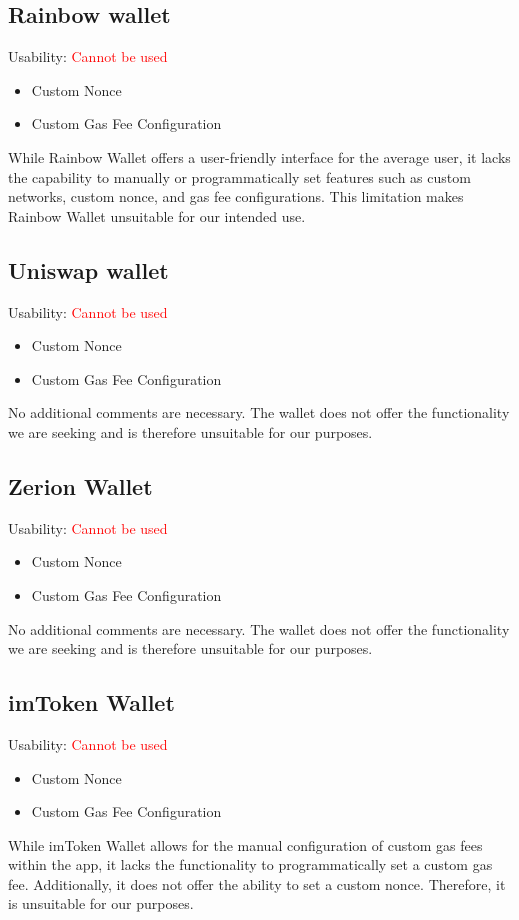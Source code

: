 \documentclass[fleqn,10pt]{olplainarticle}
\newcommand{\xmark}{\ding{55}}%
\begin{document}
\subsection{Rainbow wallet}
Usability: \textcolor{red}{Cannot be used}
\begin{itemize}[noitemsep, nolistsep]
	\item [\textcolor{red}{\xmark}] Custom Nonce
	\item [\textcolor{red}{\xmark}] Custom Gas Fee Configuration
\end{itemize}
While Rainbow Wallet offers a user-friendly interface for the average user, it lacks the capability to manually or programmatically set features such as custom networks, custom nonce, and gas fee configurations. This limitation makes Rainbow Wallet unsuitable for our intended use.

\subsection{Uniswap wallet}
Usability: \textcolor{red}{Cannot be used}
\begin{itemize}[noitemsep, nolistsep]
	\item [\textcolor{red}{\xmark}] Custom Nonce
	\item [\textcolor{red}{\xmark}] Custom Gas Fee Configuration
\end{itemize}
No additional comments are necessary. The wallet does not offer the functionality we are seeking and is therefore unsuitable for our purposes.

\subsection{Zerion Wallet}
Usability: \textcolor{red}{Cannot be used}
\begin{itemize}[noitemsep, nolistsep]
	\item [\textcolor{red}{\xmark}] Custom Nonce
	\item [\textcolor{red}{\xmark}] Custom Gas Fee Configuration
\end{itemize}
No additional comments are necessary. The wallet does not offer the functionality we are seeking and is therefore unsuitable for our purposes.

\subsection{imToken Wallet}
Usability: \textcolor{red}{Cannot be used}
\begin{itemize}[noitemsep, nolistsep]
	\item [\textcolor{red}{\xmark}] Custom Nonce
	\item [\textcolor{red}{\xmark}] Custom Gas Fee Configuration
\end{itemize}
While imToken Wallet allows for the manual configuration of custom gas fees within the app, it lacks the functionality to programmatically set a custom gas fee. Additionally, it does not offer the ability to set a custom nonce. Therefore, it is unsuitable for our purposes.
\end{document}
